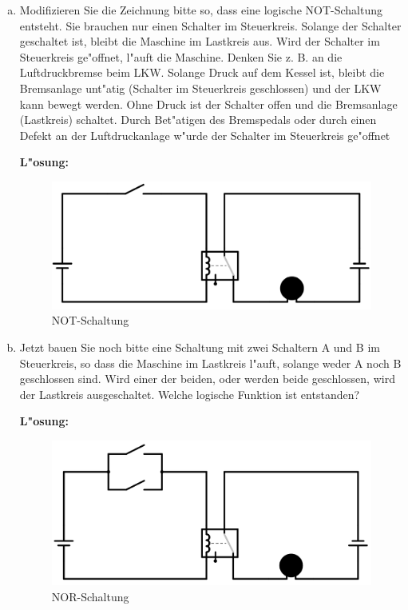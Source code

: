 \documentclass[10pt, a4paper, oneside]{article}
\begin{document}
\begin{enumerate}[(a)]
    \item Modifizieren Sie die Zeichnung bitte so, dass eine logische
        NOT-Schaltung entsteht. Sie brauchen nur einen Schalter im Steuerkreis.
        Solange der Schalter geschaltet ist, bleibt die Maschine im Lastkreis
        aus. Wird der Schalter im Steuerkreis ge"offnet, l"auft die Maschine.
        Denken Sie z. B. an die Luftdruckbremse beim LKW. Solange Druck auf dem
        Kessel ist, bleibt die Bremsanlage unt"atig (Schalter im Steuerkreis
        geschlossen) und der LKW kann bewegt werden. Ohne Druck ist der
        Schalter offen und die Bremsanlage (Lastkreis) schaltet. Durch
        Bet"atigen des Bremspedals oder durch einen Defekt an der
        Luftdruckanlage w"urde der Schalter im Steuerkreis ge"offnet

        \textbf{L"osung:}

        \begin{figure}[h]
            \includegraphics[width=1\textwidth]{./assets/not-circuit.png}
            \caption{NOT-Schaltung}
        \end{figure}

    \item Jetzt bauen Sie noch bitte eine Schaltung mit zwei Schaltern A und B
        im Steuerkreis, so dass die Maschine im Lastkreis l"auft, solange weder
        A noch B geschlossen sind. Wird einer der beiden, oder werden beide
        geschlossen, wird der Lastkreis ausgeschaltet. Welche logische Funktion
        ist entstanden?

        \textbf{L"osung:}

        \begin{figure}[h]
            \includegraphics[width=1\textwidth]{./assets/nor-circuit.png}
            \caption{NOR-Schaltung}
        \end{figure}

\end{enumerate}
\end{document}
